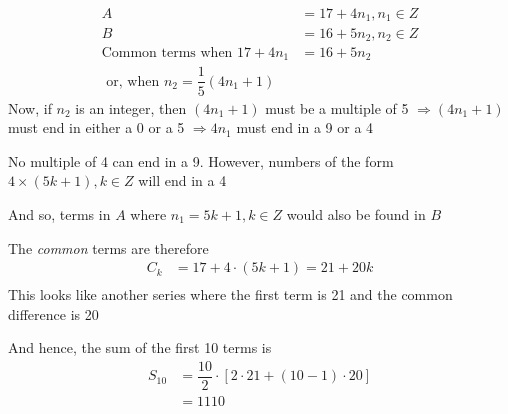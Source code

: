 \begin{solution}[\halfpage]
  \begin{align}
  	A &= 17 + 4n_1, n_1 \in Z\\
  	B &= 16 + 5n_2, n_2 \in Z \\
  	\text{Common terms when } 17+4n_1 &= 16+5n_2 \\ 
  	\text{ or, when } n_2 = \dfrac{1}{5}(4n_1 + 1)
  \end{align}
  Now, if $n_2$ is an integer, then $(4n_1+1)$ must be a multiple of 5 $\Rightarrow (4n_1+1)$
  must end in either a 0 or a 5 $\Rightarrow 4n_1$ must end in a 9 or a 4
  
  No multiple of 4 can end in a 9. However, numbers of the form $4\times (5k+1), k \in Z$
  will end in a 4
  
  And so, terms in $A$ where $n_1 = 5k+1, k \in Z$ would also be found in $B$
  
  The \textit{common} terms are therefore
  \begin{align}
  	C_k &= 17 + 4\cdot(5k + 1) = 21 + 20k \\
  \end{align}
  This looks like another series where the first term is 21 and the common difference is 20
  
  And hence, the sum of the first 10 terms is
  \begin{align}
  	S_{10} &= \dfrac{10}{2}\cdot\left[ 2\cdot 21 + (10-1)\cdot 20 \right] \\
  	       &= 1110
  \end{align}
\end{solution} 
